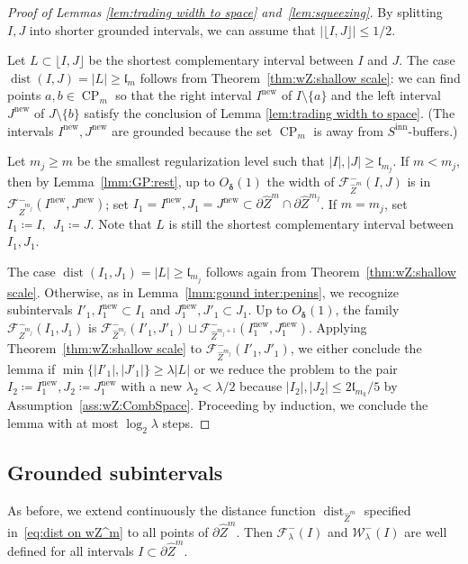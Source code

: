 \documentclass{amsart}
\renewcommand{\sp}{{\ \ }}
\newcommand{\1}{{\mathbb 1 }}
\newcommand{\Fam}{{\mathcal F}}
\newcommand{\Width}{{\mathcal W}}
\newcommand{\wZ}{{\widehat Z}}
\newcommand{\length}{{\mathfrak l}}
\newcommand\inn{{\operatorname{inn}}}
\newcommand\new{{\operatorname{new}}}
\theoremstyle{remark}
\numberwithin{equation}{section}
\theoremstyle{definition}
\newcommand{\dist}{\operatorname{dist}}
\newcommand{\CP}{{\operatorname{CP}}}
\newcommand{\bdelta}{{\boldsymbol{ \delta}}}
\begin{document}
\begin{proof}[Proof of Lemmas \ref{lem:trading  width to space} and~\ref{lem:squeezing}] By splitting $I,J$ into shorter grounded intervals, we can assume that $|\lfloor I, J\rfloor |\le 1/2$. 

Let $L\subset \lfloor I,J \rfloor$ be the shortest complementary interval between $I$ and $J$. The case $\dist(I,J) =|L|\ge \length_m$ follows from Theorem~\ref{thm:wZ:shallow scale}: we can find points $a,b\in \CP_{m}$ so that the right interval $I^\new$ of $I\setminus \{a\}$ and the left interval $J^\new$ of $J\setminus \{b\}$ satisfy the conclusion of Lemma \ref{lem:trading  width to space}. (The intervals $I^\new, J^\new$ are grounded because the set $\CP_m$ is away from $S^\inn$-buffers.)



Let $m_j\ge m$ be the smallest regularization level such that $|I|,|J|\ge \length_{m_j}$. If $m< m_j$, then by Lemma~\ref{lmm:GP:rest}, up to $O_\bdelta(1)$ the width of $\Fam^-_{\wZ^m}(I,J)$ is in $\Fam^-_{\wZ^{m_j}}(I^\new,J^\new)$; set $I_1=I^\new,J_1=J^\new\subset \partial \wZ^m\cap \partial\wZ^{m_j}$. If $m=m_j$, set $I_1\coloneqq I, \sp J_1\coloneqq J$. Note that $L$ is still the shortest complementary interval between $I_1, J_1$. 



The case $\dist(I_1,J_1) =|L|\ge \length_{m_j}$ follows again from Theorem~\ref{thm:wZ:shallow scale}. Otherwise,  as in Lemma~\ref{lmm:gound inter:penins}, we recognize subintervals $I'_1,  I^\new_1\subset I_1$ and $J^\new_1, J'_1\subset J_1$. Up to $O_\bdelta(1)$, the family $\Fam^-_{\wZ^{m_j}} (I_1,J_1)$ is $\Fam^-_{ \wZ^{m_j} }(I'_1,J'_1)\sqcup \Fam^-_{ \wZ^{m_j+1} }(I^\new_1,J^\new_1)$. Applying Theorem~\ref{thm:wZ:shallow scale} to $\Fam^-_{ \wZ^{m_j} }(I'_1,J'_1)$, we either conclude the lemma if $\min\{|I'_1|,|J'_1|\}\ge \lambda  |L|$ or we reduce the problem to the pair $I_2\coloneqq I_1^\new, J_2\coloneqq J^\new_1$ with a new $\lambda_2< \lambda/2$ because $|I_2|,|J_2|\le 2\length_{m_k}/5$ by Assumption~\ref{ass:wZ:CombSpace}. Proceeding by induction, we conclude the lemma with at most $\log_2 \lambda$ steps. 
\end{proof}


\subsection{Grounded subintervals}
\label{ss:Bett Grnd Inter}
As before, we extend continuously the distance function $\dist_{\wZ^m}$ specified in~\eqref{eq:dist on wZ^m} to all points of $\partial \wZ^m$. Then $\Fam^-_\lambda(I)$ and $\Width^-_\lambda(I)$ are well defined for all intervals $I\subset \partial \wZ^m$. 
\end{document}
